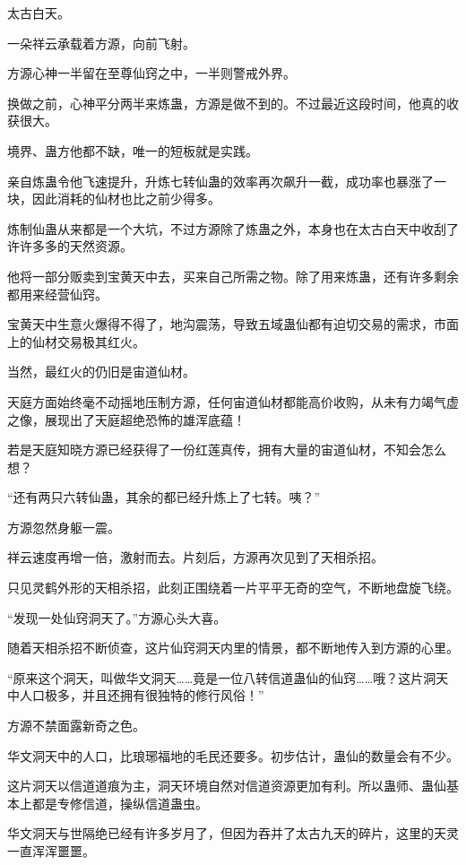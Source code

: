 
\begin{this_body}

太古白天。

一朵祥云承载着方源，向前飞射。

方源心神一半留在至尊仙窍之中，一半则警戒外界。

换做之前，心神平分两半来炼蛊，方源是做不到的。不过最近这段时间，他真的收获很大。

境界、蛊方他都不缺，唯一的短板就是实践。

亲自炼蛊令他飞速提升，升炼七转仙蛊的效率再次飙升一截，成功率也暴涨了一块，因此消耗的仙材也比之前少得多。

炼制仙蛊从来都是一个大坑，不过方源除了炼蛊之外，本身也在太古白天中收刮了许许多多的天然资源。

他将一部分贩卖到宝黄天中去，买来自己所需之物。除了用来炼蛊，还有许多剩余都用来经营仙窍。

宝黄天中生意火爆得不得了，地沟震荡，导致五域蛊仙都有迫切交易的需求，市面上的仙材交易极其红火。

当然，最红火的仍旧是宙道仙材。

天庭方面始终毫不动摇地压制方源，任何宙道仙材都能高价收购，从未有力竭气虚之像，展现出了天庭超绝恐怖的雄浑底蕴！

若是天庭知晓方源已经获得了一份红莲真传，拥有大量的宙道仙材，不知会怎么想？

“还有两只六转仙蛊，其余的都已经升炼上了七转。咦？”

方源忽然身躯一震。

祥云速度再增一倍，激射而去。片刻后，方源再次见到了天相杀招。

只见灵鹤外形的天相杀招，此刻正围绕着一片平平无奇的空气，不断地盘旋飞绕。

“发现一处仙窍洞天了。”方源心头大喜。

随着天相杀招不断侦查，这片仙窍洞天内里的情景，都不断地传入到方源的心里。

“原来这个洞天，叫做华文洞天……竟是一位八转信道蛊仙的仙窍……哦？这片洞天中人口极多，并且还拥有很独特的修行风俗！”

方源不禁面露新奇之色。

华文洞天中的人口，比琅琊福地的毛民还要多。初步估计，蛊仙的数量会有不少。

这片洞天以信道道痕为主，洞天环境自然对信道资源更加有利。所以蛊师、蛊仙基本上都是专修信道，操纵信道蛊虫。

华文洞天与世隔绝已经有许多岁月了，但因为吞并了太古九天的碎片，这里的天灵一直浑浑噩噩。


\end{this_body}
